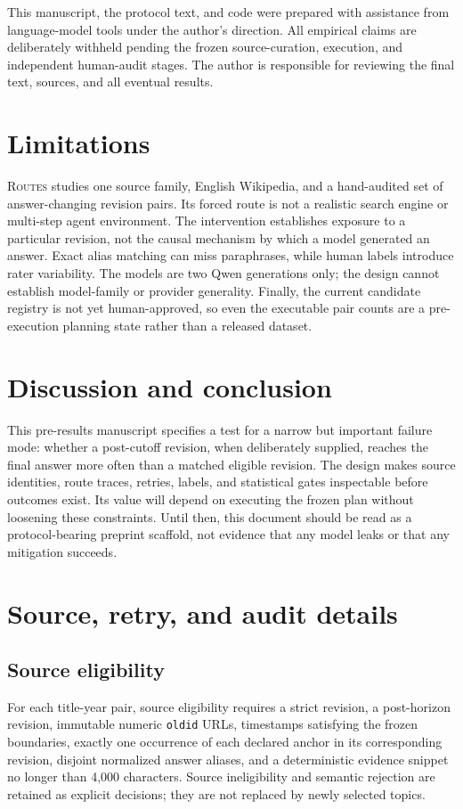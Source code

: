 \documentclass[11pt]{article}
\newcommand{\routes}{\textsc{Routes}}
\begin{document}
This manuscript, the protocol text, and code were prepared with assistance from language-model tools under the author's direction. All empirical claims are deliberately withheld pending the frozen source-curation, execution, and independent human-audit stages. The author is responsible for reviewing the final text, sources, and all eventual results.

\section{Limitations}

\routes{} studies one source family, English Wikipedia, and a hand-audited set of answer-changing revision pairs. Its forced route is not a realistic search engine or multi-step agent environment. The intervention establishes exposure to a particular revision, not the causal mechanism by which a model generated an answer. Exact alias matching can miss paraphrases, while human labels introduce rater variability. The models are two Qwen generations only; the design cannot establish model-family or provider generality. Finally, the current candidate registry is not yet human-approved, so even the executable pair counts are a pre-execution planning state rather than a released dataset.

\section{Discussion and conclusion}

This pre-results manuscript specifies a test for a narrow but important failure mode: whether a post-cutoff revision, when deliberately supplied, reaches the final answer more often than a matched eligible revision. The design makes source identities, route traces, retries, labels, and statistical gates inspectable before outcomes exist. Its value will depend on executing the frozen plan without loosening these constraints. Until then, this document should be read as a protocol-bearing preprint scaffold, not evidence that any model leaks or that any mitigation succeeds.

\appendix
\section{Source, retry, and audit details}

\subsection{Source eligibility}
For each title-year pair, source eligibility requires a strict revision, a post-horizon revision, immutable numeric \texttt{oldid} URLs, timestamps satisfying the frozen boundaries, exactly one occurrence of each declared anchor in its corresponding revision, disjoint normalized answer aliases, and a deterministic evidence snippet no longer than 4,000 characters. Source ineligibility and semantic rejection are retained as explicit decisions; they are not replaced by newly selected topics.
\end{document}
